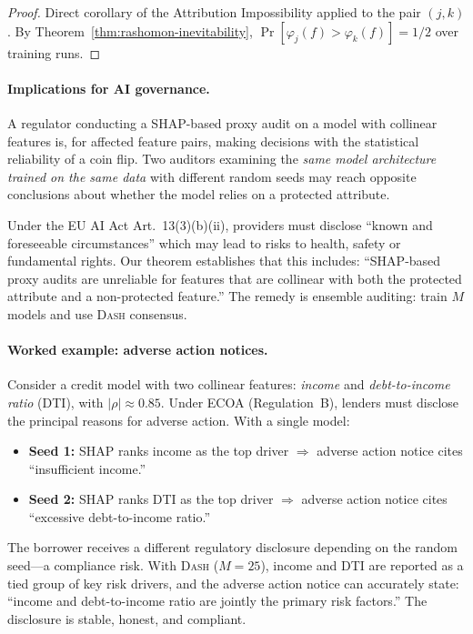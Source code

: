 \documentclass{article}
\newcommand{\DASH}{\textsc{Dash}}
\begin{document}
\begin{proof}
Direct corollary of the Attribution Impossibility applied to the pair $(j, k)$. By Theorem~\ref{thm:rashomon-inevitability}, $\Pr[\varphi_j(f) > \varphi_k(f)] = 1/2$ over training runs.
\end{proof}

\paragraph{Implications for AI governance.}
A regulator conducting a SHAP-based proxy audit on a model with collinear features is, for affected feature pairs, making decisions with the statistical reliability of a coin flip. Two auditors examining the \emph{same model architecture trained on the same data} with different random seeds may reach opposite conclusions about whether the model relies on a protected attribute.

Under the EU AI Act Art.~13(3)(b)(ii), providers must disclose ``known and foreseeable circumstances'' which may lead to risks to health, safety or fundamental rights. Our theorem establishes that this includes: ``SHAP-based proxy audits are unreliable for features that are collinear with both the protected attribute and a non-protected feature.'' The remedy is ensemble auditing: train $M$ models and use \DASH{} consensus.

\paragraph{Worked example: adverse action notices.}
Consider a credit model with two collinear features: \emph{income} and \emph{debt-to-income ratio} (DTI), with $|\rho| \approx 0.85$. Under ECOA (Regulation~B), lenders must disclose the principal reasons for adverse action. With a single model:
\begin{itemize}
    \item \textbf{Seed 1:} SHAP ranks income as the top driver $\Rightarrow$ adverse action notice cites ``insufficient income.''
    \item \textbf{Seed 2:} SHAP ranks DTI as the top driver $\Rightarrow$ adverse action notice cites ``excessive debt-to-income ratio.''
\end{itemize}
The borrower receives a different regulatory disclosure depending on the random seed---a compliance risk. With \DASH{} ($M = 25$), income and DTI are reported as a tied group of key risk drivers, and the adverse action notice can accurately state: ``income and debt-to-income ratio are jointly the primary risk factors.'' The disclosure is stable, honest, and compliant.
\end{document}
